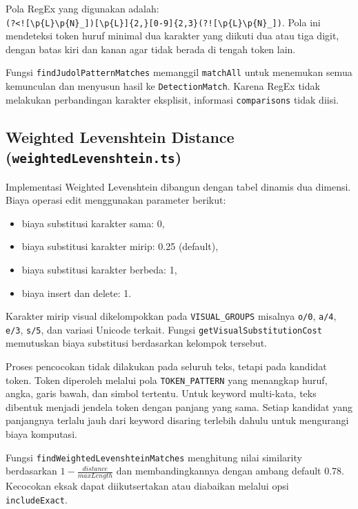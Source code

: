 Pola RegEx yang digunakan adalah:\\
\texttt{(?<![\textbackslash{}p\{L\}\textbackslash{}p\{N\}\_])[\textbackslash{}p\{L\}]\{2,\}[0-9]\{2,3\}(?![\textbackslash{}p\{L\}\textbackslash{}p\{N\}\_])}.
Pola ini mendeteksi token huruf minimal dua karakter yang diikuti dua atau
tiga digit, dengan batas kiri dan kanan agar tidak berada di tengah token
lain.

Fungsi \texttt{findJudolPatternMatches} memanggil \texttt{matchAll} untuk
menemukan semua kemunculan dan menyusun hasil ke \texttt{DetectionMatch}.
Karena RegEx tidak melakukan perbandingan karakter eksplisit, informasi
\texttt{comparisons} tidak diisi.

\subsection{Weighted Levenshtein Distance (\texttt{weightedLevenshtein.ts})}

Implementasi Weighted Levenshtein dibangun dengan tabel dinamis dua dimensi.
Biaya operasi edit menggunakan parameter berikut:

\begin{itemize}
	\item biaya substitusi karakter sama: 0,
	\item biaya substitusi karakter mirip: 0.25 (default),
	\item biaya substitusi karakter berbeda: 1,
	\item biaya insert dan delete: 1.
\end{itemize}

Karakter mirip visual dikelompokkan pada \texttt{VISUAL\_GROUPS}
misalnya \texttt{o/0}, \texttt{a/4}, \texttt{e/3}, \texttt{s/5},
dan variasi Unicode terkait. Fungsi \texttt{getVisualSubstitutionCost}
memutuskan biaya substitusi berdasarkan kelompok tersebut.

Proses pencocokan tidak dilakukan pada seluruh teks, tetapi pada kandidat
token. Token diperoleh melalui pola \texttt{TOKEN\_PATTERN} yang menangkap
huruf, angka, garis bawah, dan simbol tertentu. Untuk keyword multi-kata,
teks dibentuk menjadi jendela token dengan panjang yang sama. Setiap kandidat
yang panjangnya terlalu jauh dari keyword disaring terlebih dahulu untuk
mengurangi biaya komputasi.

Fungsi \texttt{findWeightedLevenshteinMatches} menghitung nilai similarity
berdasarkan $1 - \frac{distance}{maxLength}$ dan membandingkannya dengan
ambang default 0.78. Kecocokan eksak dapat diikutsertakan atau diabaikan
melalui opsi \texttt{includeExact}.

